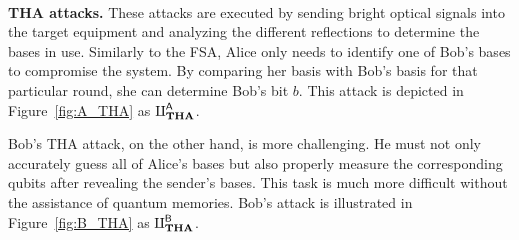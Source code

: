 \

\noindent\textbf{THA attacks.} These attacks are executed by sending bright optical signals into the target equipment and analyzing the different reflections to determine the bases in use. Similarly to the FSA, Alice only needs to identify one of Bob's bases to compromise the system. By comparing her basis with Bob's basis for that particular round, she can determine Bob's bit $b$. This attack is depicted in Figure~\ref{fig:A_THA} as $\rotPi^{\mathsf{A}}_{\textbf{THA}}$.

Bob's THA attack, on the other hand, is more challenging. He must not only accurately guess all of Alice's bases but also properly measure the corresponding qubits after revealing the sender's bases. This task is much more difficult without the assistance of quantum memories. Bob's attack is illustrated in Figure~\ref{fig:B_THA} as $\rotPi^{\mathsf{B}}_{\textbf{THA}}$.









